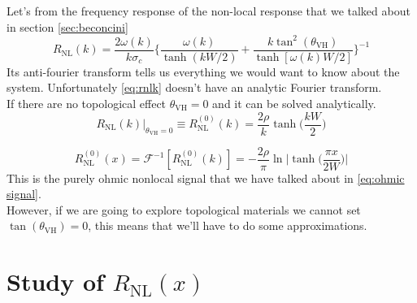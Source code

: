 Let's from the frequency response of the non-local response that we talked about in section \ref{sec:beconcini} \cite{Beconcini_2016}
\begin{equation}
    R_{\textrm{NL}}(k)=\frac{2\omega(k)}{k\sigma_c}
    \bigg\{
        \frac{\omega(k)}{\tanh(kW/2)} + \frac{k\tan^2(\theta_{\textrm{VH}})}{\tanh[\omega(k)W/2]}    
    \bigg\}^{-1}
    \label{eq:rnlk}
\end{equation}
Its anti-fourier transform tells us everything we would want to know about the system. Unfortunately \ref{eq:rnlk} doesn't have an analytic Fourier transform.\\ If there are no topological effect $\theta_{\textrm{VH}}=0$ and it can be solved analytically.
\begin{equation}
    R_{\textrm{NL}}(k)|_{\theta_{\textrm{VH}}=0}\equiv R_{\textrm{NL}}^{(0)}(k)=
    \frac{2\rho}k\tanh\bigg(\frac{kW}2\bigg)
    \label{eq:ohmick}
\end{equation}

\begin{equation}
    R_{\textrm{NL}}^{(0)}(x)=
    \mathcal F^{-1}\left[R_{\textrm{NL}}^{(0)}(k) \right]=
    -\frac{2\rho}\pi\ln\bigg |\tanh \Big(\frac{\pi x}{2W}\Big)\bigg |
    \label{eq:ohmic signal2}
\end{equation}
This is the purely ohmic nonlocal signal that we have talked about in \ref{eq:ohmic signal}.\\
However, if we are going to explore topological materials we cannot set $\tan (\theta_{\textrm{VH}})=0$, this means that we'll have to do some approximations.

\section{Study of $R_{\textrm{NL}}(x)$}

